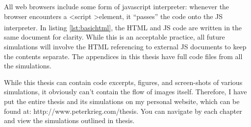 All web browsers include some form of javascript interpreter: whenever the browser encounters a \textless script \textgreater element, it     ``passes''  the code onto the JS interpreter.\textsuperscript{\cite{jsdefinitive}}  In listing \ref{lst:basichtml}, the HTML and JS code are written in the same document for clarity.  While this is an acceptable practice, all future simulations will involve the HTML referencing to external JS documents to keep the contents separate.  The appendices in this thesis have full code files from all the simulations.  

While this thesis can contain code excerpts, figures, and screen-shots of various simulations, it obviously can't contain the flow of images itself.  Therefore, I have put the entire thesis and its simulations on my personal website, which can be found at:  http://www.peterkrieg.com/thesis.  You can navigate by each chapter and view the simulations outlined in thesis. 




